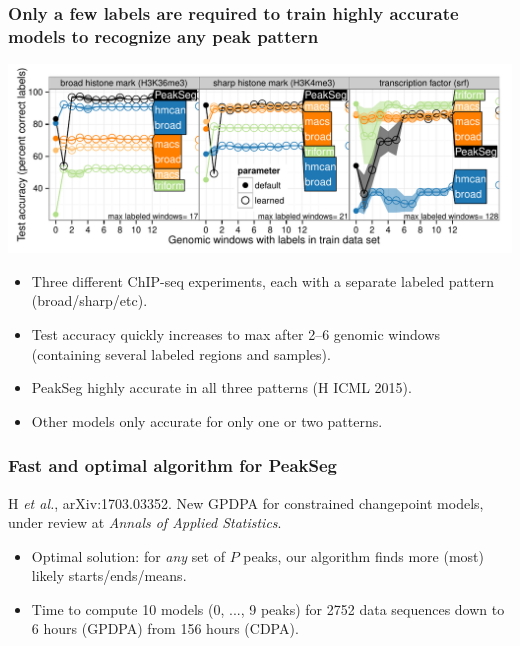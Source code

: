 \documentclass{beamer}
\newcommand{\algo}[1]{\textcolor{#1}{#1}}
\begin{document}
\begin{frame}
  \frametitle{Only a few labels are required to train highly accurate models to recognize any peak pattern}
  \includegraphics[width=1.1\textwidth]{figure-test-error-decreases-mean.pdf}
 
  \begin{itemize}
  \item Three different ChIP-seq experiments, each with a separate
    labeled pattern (broad/sharp/etc).
  \item Test accuracy quickly increases to max after 2--6
    genomic windows (containing several labeled regions and samples).
  \item PeakSeg highly accurate in all three patterns (H ICML 2015).
  \item Other models only accurate for only one or two patterns.
  \end{itemize}
\end{frame}

\begin{frame}
  \frametitle{Fast and optimal algorithm for PeakSeg}
  H {\it et al.}, arXiv:1703.03352. New GPDPA for 
  constrained changepoint models, under review at {\it Annals of
    Applied Statistics}.
  \begin{itemize}
  \item Optimal solution: for \emph{any} set of $P$ peaks, our
    algorithm finds more (most) likely starts/ends/means.
  \item Time to compute 10 models (0, ..., 9 peaks) for 2752 data
    sequences down to \textcolor{GPDPA}{6 hours (GPDPA)} from
    \textcolor{CDPA}{156 hours (CDPA)}.
  \end{itemize}

  

\end{frame}
\end{document}
